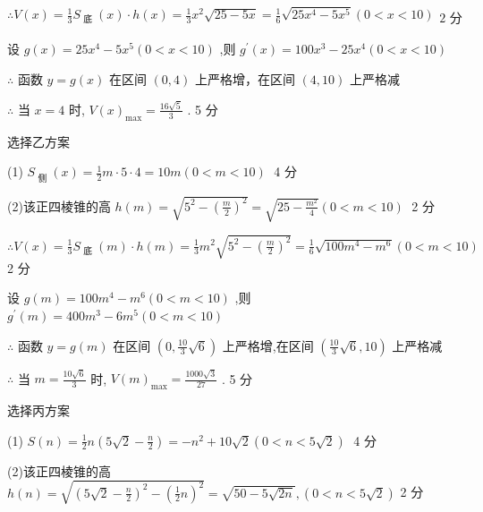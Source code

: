 \documentclass[10pt]{article}
\begin{document}
\(\therefore V\left( x\right)  = \frac{1}{3}{S}_{\text{ 底 }}\left( x\right)  \cdot  h\left( x\right)  = \frac{1}{3}{x}^{2}\sqrt{{25} - {5x}} = \frac{1}{6}\sqrt{{25}{x}^{4} - 5{x}^{5}}\left( {0 < x < {10}}\right) \begin{array}{l}  \\  2\text{ 分 } \end{array}\)

设 \(g\left( x\right)  = {25}{x}^{4} - 5{x}^{5}\left( {0 < x < {10}}\right)\) ,则 \({g}^{\prime }\left( x\right)  = {100}{x}^{3} - {25}{x}^{4}\left( {0 < x < {10}}\right)\)

\(\therefore\) 函数 \(y = g\left( x\right)\) 在区间 \(\left( {0,4}\right)\) 上严格增，在区间 \(\left( {4,{10}}\right)\) 上严格减

\(\therefore\) 当 \(x = 4\) 时, \(V{\left( x\right) }_{\max } = \frac{{16}\sqrt{5}}{3}\) . 5 分

选择乙方案

(1) \({S}_{\text{ 侧 }}\left( x\right)  = \frac{1}{2}m \cdot  5 \cdot  4 = {10m}\left( {0 < m < {10}}\right) \;\) 4 分

(2)该正四棱锥的高 \(h\left( m\right)  = \sqrt{{5}^{2} - {\left( \frac{m}{2}\right) }^{2}} = \sqrt{{25} - \frac{{m}^{2}}{4}}\left( {0 < m < {10}}\right) \;\) 2 分

\(\therefore V\left( x\right)  = \frac{1}{3}{S}_{\text{ 底 }}\left( m\right)  \cdot  h\left( m\right)  = \frac{1}{3}{m}^{2}\sqrt{{5}^{2} - {\left( \frac{m}{2}\right) }^{2}} = \frac{1}{6}\sqrt{{100}{m}^{4} - {m}^{6}}\left( {0 < m < {10}}\right)\) 2 分

设 \(g\left( m\right)  = {100}{m}^{4} - {m}^{6}\left( {0 < m < {10}}\right)\) ,则 \({g}^{\prime }\left( m\right)  = {400}{m}^{3} - 6{m}^{5}\left( {0 < m < {10}}\right)\)

\(\therefore\) 函数 \(y = g\left( m\right)\) 在区间 \(\left( {0,\frac{10}{3}\sqrt{6}}\right)\) 上严格增,在区间 \(\left( {\frac{10}{3}\sqrt{6},{10}}\right)\) 上严格减

\(\therefore\) 当 \(m = \frac{{10}\sqrt{6}}{3}\) 时, \(V{\left( m\right) }_{\max } = \frac{{1000}\sqrt{3}}{27}\) . 5 分

选择丙方案

(1) \(S\left( n\right)  = \frac{1}{2}n\left( {5\sqrt{2} - \frac{n}{2}}\right)  =  - {n}^{2} + {10}\sqrt{2}\left( {0 < n < 5\sqrt{2}}\right) \;\) 4 分

(2)该正四棱锥的高 \(h\left( n\right)  = \sqrt{{\left( 5\sqrt{2} - \frac{n}{2}\right) }^{2} - {\left( \frac{1}{2}n\right) }^{2}} = \sqrt{{50} - 5\sqrt{2n}},\left( {0 < n < 5\sqrt{2}}\right)\) 2 分
\end{document}
